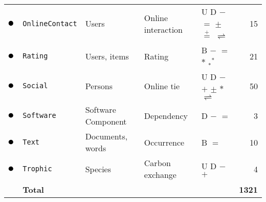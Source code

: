 \begin{tabular}{lllllr}
\textcolor{colorOnlineContact}{$\newmoon$} &\texttt{OnlineContact} & Users & Online interaction & U D \phantom{B} $-$ $=$ \phantom{$+$} $\pm$ $\stackrel{+}{=}$ \phantom{$*$} \phantom{$_*{}^*$} $\rightleftharpoons$ \phantom{$++$}  &  15\\
\textcolor{colorRating}{$\newmoon$} &\texttt{Rating} & Users, items & Rating & \phantom{U} \phantom{D} B $-$ $=$ \phantom{$+$} \phantom{$\pm$} \phantom{$\stackrel{+}{=}$} $*$ $_*{}^*$ \phantom{$\rightleftharpoons$} \phantom{$++$}  &  21\\
\textcolor{colorSocial}{$\newmoon$} &\texttt{Social} & Persons & Online tie & U D \phantom{B} $-$ \phantom{$=$} $+$ $\pm$ \phantom{$\stackrel{+}{=}$} $*$ \phantom{$_*{}^*$} $\rightleftharpoons$ \phantom{$++$}  &  50\\
\textcolor{colorSoftware}{$\newmoon$} &\texttt{Software} & Software Component & Dependency & \phantom{U} D \phantom{B} $-$ $=$ \phantom{$+$} \phantom{$\pm$} \phantom{$\stackrel{+}{=}$} \phantom{$*$} \phantom{$_*{}^*$} \phantom{$\rightleftharpoons$} \phantom{$++$}  &  3\\
\textcolor{colorText}{$\newmoon$} &\texttt{Text} & Documents, words & Occurrence & \phantom{U} \phantom{D} B \phantom{$-$} $=$ \phantom{$+$} \phantom{$\pm$} \phantom{$\stackrel{+}{=}$} \phantom{$*$} \phantom{$_*{}^*$} \phantom{$\rightleftharpoons$} \phantom{$++$}  &  10\\
\textcolor{colorTrophic}{$\newmoon$} &\texttt{Trophic} & Species & Carbon exchange & U D \phantom{B} $-$ \phantom{$=$} $+$ \phantom{$\pm$} \phantom{$\stackrel{+}{=}$} \phantom{$*$} \phantom{$_*{}^*$} \phantom{$\rightleftharpoons$} \phantom{$++$}  &  4\\
\midrule
& \textbf{Total} &&&& \textbf{1321}\\
\bottomrule
\end{tabular}

